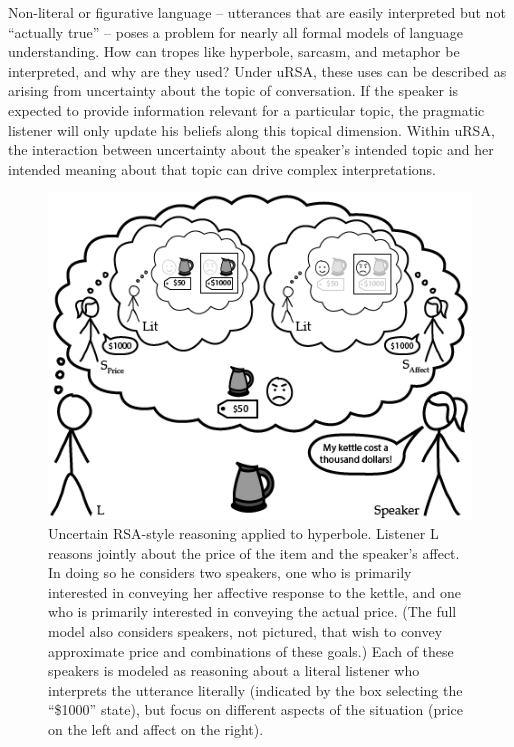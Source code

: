 \documentclass[]{elsarticle}
\begin{document}
Non-literal or figurative language -- utterances that are easily interpreted but not
``actually true'' -- poses a problem for nearly all formal models of language
understanding. How can tropes like
hyperbole, sarcasm, and metaphor be interpreted, and why are they used?
Under uRSA, these uses can be described as arising from uncertainty
about the topic of conversation. If the speaker is expected to provide
information relevant for a particular topic,
the pragmatic listener will only update his beliefs along this topical
dimension. Within uRSA, the interaction between uncertainty about the speaker's
intended topic and her intended meaning about that topic can drive
complex interpretations.

\begin{figure}[ht]
\begin{center}
\includegraphics[width=1.0\textwidth]{image03.png}
\caption{\label{fig:ursa} Uncertain RSA-style reasoning applied to hyperbole. Listener L reasons jointly about the price of the item and the speaker's affect. In doing so he considers two speakers, one who is primarily interested in conveying her affective response to the kettle, and one who is primarily interested in conveying the actual price. (The full model also considers speakers, not pictured, that wish to convey approximate price and combinations of these goals.) Each of these speakers is modeled as reasoning about a literal listener who interprets the utterance literally (indicated by the box selecting the ``\$1000'' state), but focus on different aspects of the situation (price on the left and affect on the right).}
\end{center}
\end{figure}
\end{document}
